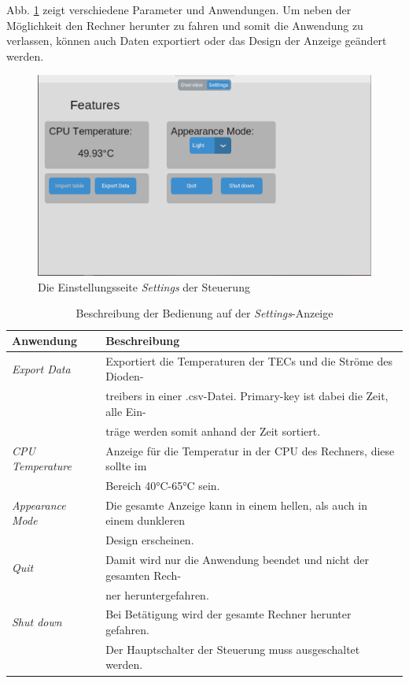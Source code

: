 Abb. \ref{fig:settings_sw} zeigt verschiedene Parameter und Anwendungen. Um neben der Möglichkeit den Rechner herunter zu fahren und somit die Anwendung zu verlassen, können auch Daten exportiert oder das Design der Anzeige geändert werden.

\begin{figure}[H]
    \centering
    \includegraphics[scale=0.3, trim={1mm 1mm 1mm 2mm}, clip]{98_images/settings_window_large_02.PNG}
    \caption{Die Einstellungsseite \textit{Settings} der Steuerung}
    \label{fig:settings_sw}
\end{figure}

\begin{table}[H]
    \centering
    \begin{tabular}{l|l}
         \textbf{Anwendung}&        \textbf{Beschreibung}\\
         \hline
         \textit{Export Data}&      Exportiert die Temperaturen der TECs und die Ströme des Dioden-\\
         &                          treibers in einer .csv-Datei. Primary-key ist dabei die Zeit, alle Ein-\\
         &                          träge werden somit anhand der Zeit sortiert.\\
         \textit{CPU Temperature}&  Anzeige für die Temperatur in der CPU des Rechners, diese sollte im\\
         &                          Bereich 40°C-65°C sein.\\
         \textit{Appearance Mode}&  Die gesamte Anzeige kann in einem hellen, als auch in einem dunkleren\\
         &                          Design erscheinen.\\
         \textit{Quit}&             Damit wird nur die Anwendung beendet und nicht der gesamten Rech-\\
         &                          ner heruntergefahren.\\
         \textit{Shut down}&        Bei Betätigung wird der gesamte Rechner herunter gefahren.\\
         &                          Der Hauptschalter der Steuerung muss ausgeschaltet werden.
    \end{tabular}
    \caption{Beschreibung der Bedienung auf der \textit{Settings}-Anzeige}
    \label{tab:settings_beschriebung_sw}
\end{table}

\nocite{*}